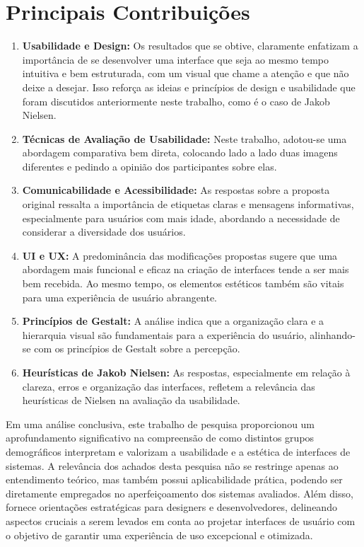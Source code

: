 \section{Principais Contribuições}
\begin{enumerate}
    \item \textbf{Usabilidade e Design:} Os resultados que se obtive, claramente enfatizam a importância de se desenvolver uma interface que seja ao mesmo tempo intuitiva e bem estruturada, com um visual que chame a atenção e que não deixe a desejar. Isso reforça as ideias e princípios de design e usabilidade que foram discutidos anteriormente neste trabalho, como é o caso de Jakob Nielsen.
    \item \textbf{Técnicas de Avaliação de Usabilidade:} Neste trabalho, adotou-se uma abordagem comparativa bem direta, colocando lado a lado duas imagens diferentes e pedindo a opinião dos participantes sobre elas.
    \item \textbf{Comunicabilidade e Acessibilidade:} As respostas sobre a proposta original ressalta a importância de etiquetas claras e mensagens informativas, especialmente para usuários com mais idade, abordando a necessidade de considerar a diversidade dos usuários.
    \item \textbf{UI e UX:} A predominância das modificações propostas sugere que uma abordagem mais funcional e eficaz na criação de interfaces tende a ser mais bem recebida. Ao mesmo tempo, os elementos estéticos também são vitais para uma experiência de usuário abrangente.
    \item \textbf{Princípios de Gestalt:} A análise indica que a organização clara e a hierarquia visual são fundamentais para a experiência do usuário, alinhando-se com os princípios de Gestalt sobre a percepção.
    \item \textbf{Heurísticas de Jakob Nielsen:} As respostas, especialmente em relação à clareza, erros e organização das interfaces, refletem a relevância das heurísticas de Nielsen na avaliação da usabilidade.
\end{enumerate}
 

Em uma análise conclusiva, este trabalho de pesquisa proporcionou um aprofundamento significativo na compreensão de como distintos grupos demográficos interpretam e valorizam a usabilidade e a estética de interfaces de sistemas. A relevância dos achados desta pesquisa não se restringe apenas ao entendimento teórico, mas também possui aplicabilidade prática, podendo ser diretamente empregados no aperfeiçoamento dos sistemas avaliados. Além disso, fornece orientações estratégicas para designers e desenvolvedores, delineando aspectos cruciais a serem levados em conta ao projetar interfaces de usuário com o objetivo de garantir uma experiência de uso excepcional e otimizada.

